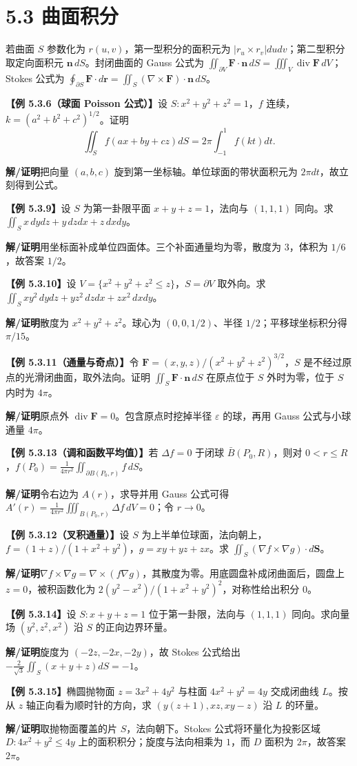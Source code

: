 \documentclass[UTF8,a4paper,11pt]{ctexart}
\newcommand{\ex}[1]{\par\medskip\noindent\textbf{【例 #1】}\;}
\newcommand{\sol}{\par\noindent\textbf{解/证明}\;}
\begin{document}
\section*{5.3 曲面积分}
若曲面 $S$ 参数化为 $r(u,v)$，第一型积分的面积元为 $|r_u\times r_v|dudv$；第二型积分取定向面积元 $\mathbf n\,dS$。封闭曲面的 Gauss 公式为 $\iint_{\partial V}\mathbf F\cdot\mathbf n\,dS=\iiint_V\operatorname{div}\mathbf F\,dV$；Stokes 公式为 $\oint_{\partial S}\mathbf F\cdot d\mathbf r=\iint_S(\nabla\times\mathbf F)\cdot\mathbf n\,dS$。
\ex{5.3.6（球面 Poisson 公式）}设 $S:x^2+y^2+z^2=1$，$f$ 连续，$k=(a^2+b^2+c^2)^{1/2}$。证明
\[\iint_S f(ax+by+cz)dS=2\pi\int_{-1}^1f(kt)dt.\]
\sol 把向量 $(a,b,c)$ 旋到第一坐标轴。单位球面的带状面积元为 $2\pi dt$，故立刻得到公式。
\ex{5.3.9}设 $S$ 为第一卦限平面 $x+y+z=1$，法向与 $(1,1,1)$ 同向。求 $\iint_Sx\,dydz+y\,dzdx+z\,dxdy$。
\sol 用坐标面补成单位四面体。三个补面通量均为零，散度为 $3$，体积为 $1/6$，故答案 $1/2$。
\ex{5.3.10}设 $V=\{x^2+y^2+z^2\le z\}$，$S=\partial V$ 取外向。求 $\iint_Sxy^2\,dydz+yz^2\,dzdx+zx^2\,dxdy$。
\sol 散度为 $x^2+y^2+z^2$。球心为 $(0,0,1/2)$、半径 $1/2$；平移球坐标积分得 $\pi/15$。
\ex{5.3.11（通量与奇点）}令 $\mathbf F=(x,y,z)/(x^2+y^2+z^2)^{3/2}$，$S$ 是不经过原点的光滑闭曲面，取外法向。证明 $\iint_S\mathbf F\cdot\mathbf n\,dS$ 在原点位于 $S$ 外时为零，位于 $S$ 内时为 $4\pi$。
\sol 原点外 $\operatorname{div}\mathbf F=0$。包含原点时挖掉半径 $\varepsilon$ 的球，再用 Gauss 公式与小球通量 $4\pi$。
\ex{5.3.13（调和函数平均值）}若 $\Delta f=0$ 于闭球 $\bar B(P_0,R)$，则对 $0<r\le R$，$f(P_0)=\frac1{4\pi r^2}\iint_{\partial B(P_0,r)}f\,dS$。
\sol 令右边为 $A(r)$，求导并用 Gauss 公式可得 $A'(r)=\frac1{4\pi r^2}\iiint_{B(P_0,r)}\Delta f\,dV=0$；令 $r\to0$。
\ex{5.3.12（叉积通量）}设 $S$ 为上半单位球面，法向朝上，$f=(1+z)/(1+x^2+y^2)$，$g=xy+yz+zx$。求 $\iint_S(\nabla f\times\nabla g)\cdot d\mathbf S$。
\sol $\nabla f\times\nabla g=\nabla\times(f\nabla g)$，其散度为零。用底圆盘补成闭曲面后，圆盘上 $z=0$，被积函数化为 $2(y^2-x^2)/(1+x^2+y^2)^2$，对称性给出积分 $0$。
\ex{5.3.14}设 $S:x+y+z=1$ 位于第一卦限，法向与 $(1,1,1)$ 同向。求向量场 $(y^2,z^2,x^2)$ 沿 $S$ 的正向边界环量。
\sol 旋度为 $(-2z,-2x,-2y)$，故 Stokes 公式给出 $-\frac2{\sqrt3}\iint_S(x+y+z)dS=-1$。
\ex{5.3.15}椭圆抛物面 $z=3x^2+4y^2$ 与柱面 $4x^2+y^2=4y$ 交成闭曲线 $L$。按从 $z$ 轴正向看为顺时针的方向，求 $(y(z+1),xz,xy-z)$ 沿 $L$ 的环量。
\sol 取抛物面覆盖的片 $S$，法向朝下。Stokes 公式将环量化为投影区域 $D:4x^2+y^2\le4y$ 上的面积积分；旋度与法向相乘为 $1$，而 $D$ 面积为 $2\pi$，故答案 $2\pi$。
\end{document}
